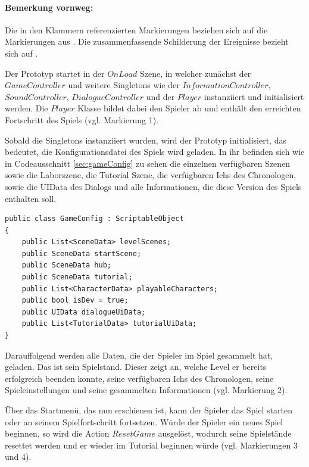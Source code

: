 \paragraph{Bemerkung vornweg:}
Die in den Klammern referenzierten Markierungen beziehen sich auf die Markierungen aus . Die zusammenfassende Schilderung der Ereignisse bezieht sich auf .


Der Prototyp startet in der $OnLoad$ Szene, in welcher zunächst der $GameController$ und weitere Singletons wie der $InformationController$,\\ $SoundController$, $DialogueController$ und der $Player$ instanziiert und initialisiert werden. Die $Player$ Klasse bildet dabei den Spieler ab und enthält den erreichten Fortschritt des Spiels (vgl. Markierung 1).

Sobald die Singletons instanziiert wurden, wird der Prototyp initialisiert, das bedeutet, die Konfigurationsdatei des Spiels wird geladen. In ihr befinden sich wie in Codeausschnitt \ref{sec:gameConfig} zu sehen die einzelnen verfügbaren Szenen sowie die Laborszene, die Tutorial Szene, die verfügbaren Ichs des Chronologen, sowie die UIData des Dialogs und alle Informationen, die diese Version des Spiels enthalten soll.
\begin{lstlisting}[caption={GameConfig.cs des Prototyps}, label={sec:gameConfig}]
public class GameConfig : ScriptableObject
{
    public List<SceneData> levelScenes;
    public SceneData startScene;
    public SceneData hub;
    public SceneData tutorial;
    public List<CharacterData> playableCharacters;
    public bool isDev = true;
    public UIData dialogueUiData;
    public List<TutorialData> tutorialUiData;
}
\end{lstlisting}

Darauffolgend werden alle Daten, die der Spieler im Spiel gesammelt hat, geladen. Das ist sein Spielstand. Dieser zeigt an, welche Level er bereits erfolgreich beenden konnte, seine verfügbaren Ichs des Chronologen, seine Spieleinstellungen und seine gesammelten Informationen (vgl. Markierung 2). 

Über das Startmenü, das nun erschienen ist, kann der Spieler das Spiel starten oder an seinem Spielfortschritt fortsetzen. Würde der Spieler ein neues Spiel beginnen, so wird die Action $ResetGame$ ausgelöst, wodurch seine Spielstände resettet werden und er wieder im Tutorial beginnen würde (vgl. Markierungen 3 und 4).

